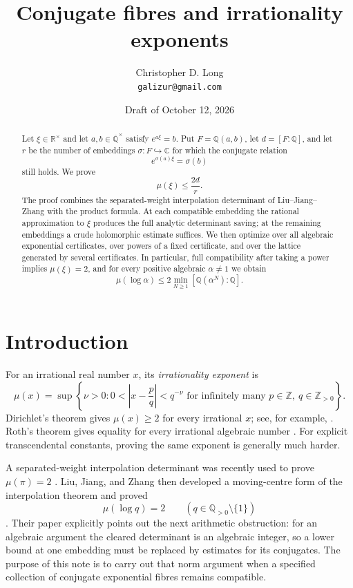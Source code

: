 \documentclass[11pt]{article}
\title{Conjugate fibres and irrationality exponents}
\author{Christopher D. Long\\[2pt]\small \texttt{galizur@gmail.com}}
\date{Draft of October 12, 2026}
\newcommand{\CC}{\mathbb C}
\newcommand{\RR}{\mathbb R}
\newcommand{\QQ}{\mathbb Q}
\newcommand{\ZZ}{\mathbb Z}
\newcommand{\Qbar}{\overline{\mathbb Q}}
\theoremstyle{definition}
\theoremstyle{remark}
\numberwithin{equation}{section}
\begin{document}
\maketitle

\begin{abstract}
Let $\xi\in\RR^\times$ and let $a,b\in\Qbar^\times$ satisfy
$e^{a\xi}=b$.  Put $F=\QQ(a,b)$, let $d=[F:\QQ]$, and let $r$ be the
number of embeddings $\sigma:F\hookrightarrow\CC$ for which the
conjugate relation
\[
  e^{\sigma(a)\xi}=\sigma(b)
\]
still holds.  We prove
\[
  \mu(\xi)\le \frac{2d}{r}.
\]
The proof combines the separated-weight interpolation determinant of
Liu--Jiang--Zhang with the product formula.  At each compatible
embedding the rational approximation to $\xi$ produces the full
analytic determinant saving; at the remaining embeddings a crude
holomorphic estimate suffices.  We then optimize over all algebraic
exponential certificates, over powers of a fixed certificate, and over
the lattice generated by several certificates.  In particular, full
compatibility after taking a power implies $\mu(\xi)=2$, and for every
positive algebraic $\alpha\ne1$ we obtain
\[
  \mu(\log\alpha)\le
  2\min_{N\ge1}[\QQ(\alpha^N):\QQ].
\]
\end{abstract}

\section{Introduction}

For an irrational real number $x$, its \emph{irrationality exponent} is
\[
 \mu(x)=\sup\left\{\nu>0:
  0<\left|x-\frac pq\right|<q^{-\nu}
  \text{ for infinitely many }p\in\ZZ,\ q\in\ZZ_{>0}\right\}.
\]
Dirichlet's theorem gives $\mu(x)\ge2$ for every irrational $x$; see,
for example, \cite[Chapter~I]{Cassels1957}.  Roth's theorem gives equality
for every irrational algebraic number \cite{Roth1955}.  For explicit
transcendental constants, proving the same exponent is generally much
harder.

A separated-weight interpolation determinant was recently used to prove
$\mu(\pi)=2$ \cite{OpenAI2026}.  Liu, Jiang, and Zhang then developed a
moving-centre form of the interpolation theorem and proved
\[
 \mu(\log q)=2
 \qquad(q\in\QQ_{>0}\setminus\{1\})
\]
\cite{LiuJiangZhang2026}.  Their paper explicitly points out the next
arithmetic obstruction: for an algebraic argument the cleared
determinant is an algebraic integer, so a lower bound at one embedding
must be replaced by estimates for its conjugates.  The purpose of this
note is to carry out that norm argument when a specified collection of
conjugate exponential fibres remains compatible.
\end{document}
